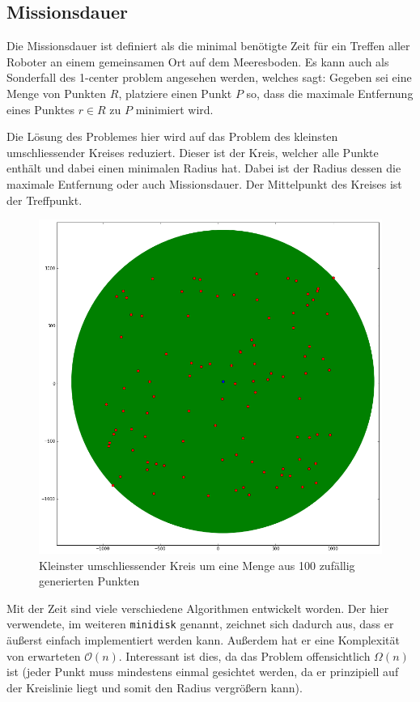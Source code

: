 \documentclass{article}
\begin{document}
\subsection{Missionsdauer}

Die Missionsdauer ist definiert als die minimal benötigte Zeit für ein Treffen aller Roboter an 
einem gemeinsamen Ort auf dem Meeresboden. Es kann auch als Sonderfall des 1-center problem angesehen werden,
welches sagt: Gegeben sei eine Menge von Punkten $R$, platziere einen Punkt $P$ so, dass die maximale Entfernung
eines Punktes $r \in R$ zu $P$ minimiert wird. 

Die Lösung des Problemes hier wird auf das Problem des kleinsten umschliessender Kreises reduziert. Dieser ist der Kreis,
welcher alle Punkte enthält und dabei einen minimalen Radius hat. Dabei ist der Radius dessen die maximale Entfernung oder
auch Missionsdauer. Der Mittelpunkt des Kreises ist der Treffpunkt.

\begin{figure}[!ht]
  \centering
  \includegraphics[width=.9\textwidth]{img/kuk_100.png}
  \caption{Kleinster umschliessender Kreis um eine Menge aus 100 zufällig generierten Punkten}
  \label{img:kuk_100}
\end{figure}

Mit der Zeit sind viele verschiedene Algorithmen entwickelt worden. Der hier verwendete, im weiteren \texttt{minidisk} genannt,
zeichnet sich dadurch aus, dass er äußerst einfach implementiert werden kann. Außerdem hat er eine Komplexität von erwarteten 
$\mathcal O(n)$. Interessant ist dies, da das Problem offensichtlich $\Omega (n)$ ist (jeder Punkt muss mindestens einmal 
gesichtet werden, da er prinzipiell auf der Kreislinie liegt und somit den Radius vergrößern kann).
\end{document}
